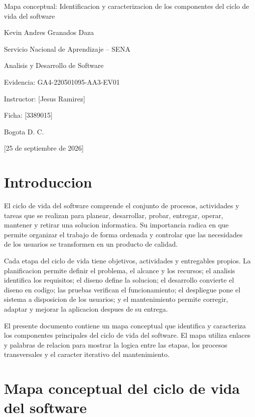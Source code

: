 \documentclass[12pt,letterpaper]{article}
\newcommand{\institucion}{Servicio Nacional de Aprendizaje -- SENA}
\newcommand{\programa}{Analisis y Desarrollo de Software}
\newcommand{\tituloTrabajo}{Mapa conceptual: Identificacion y caracterizacion de los componentes del ciclo de vida del software}
\newcommand{\codigoEvidencia}{GA4-220501095-AA3-EV01}
\newcommand{\aprendiz}{Kevin Andres Granados Daza}
\newcommand{\instructor}{[Jesus Ramirez]}
\newcommand{\ficha}{[3389015]}
\newcommand{\ciudad}{Bogota D. C.}
\newcommand{\fechaEntrega}{[25 de septiembre de 2026]}
\begin{document}
\begin{titlepage}
    \centering
    \vspace*{2.5cm}
    {\Large \tituloTrabajo\par}
    \vfill
    {\large \aprendiz\par}
    \vspace{1.5cm}
    {\large \institucion\par}
    {\large \programa\par}
    \vspace{1cm}
    {\large Evidencia: \codigoEvidencia\par}
    \vspace{1cm}
    {\large Instructor: \instructor\par}
    {\large Ficha: \ficha\par}
    \vfill
    {\large \ciudad\par}
    {\large \fechaEntrega\par}
\end{titlepage}

\section{Introduccion}

El ciclo de vida del software comprende el conjunto de procesos, actividades y tareas que se realizan para planear, desarrollar, probar, entregar, operar, mantener y retirar una solucion informatica. Su importancia radica en que permite organizar el trabajo de forma ordenada y controlar que las necesidades de los usuarios se transformen en un producto de calidad.

Cada etapa del ciclo de vida tiene objetivos, actividades y entregables propios. La planificacion permite definir el problema, el alcance y los recursos; el analisis identifica los requisitos; el diseno define la solucion; el desarrollo convierte el diseno en codigo; las pruebas verifican el funcionamiento; el despliegue pone el sistema a disposicion de los usuarios; y el mantenimiento permite corregir, adaptar y mejorar la aplicacion despues de su entrega.

El presente documento contiene un mapa conceptual que identifica y caracteriza los componentes principales del ciclo de vida del software. El mapa utiliza enlaces y palabras de relacion para mostrar la logica entre las etapas, los procesos transversales y el caracter iterativo del mantenimiento.

\section{Mapa conceptual del ciclo de vida del software}
\end{document}
